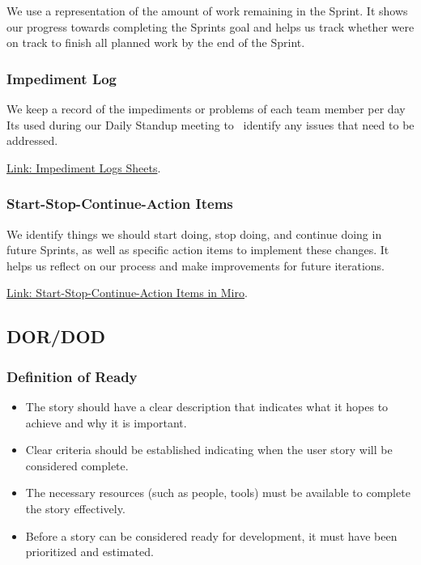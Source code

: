 We use a representation of the amount of work remaining in the Sprint.
It shows our progress towards completing the Sprint\textquotesingle s
goal and helps us track whether we\textquotesingle re on track to finish
all planned work by the end of the Sprint.

\hypertarget{impedimentlog}{
\subsubsection{\texorpdfstring{\textbf{Impediment
Log}}{Impediment Log}}\label{impedimentlog}}

We keep a record of the impediments or problems of each team member per
day It\textquotesingle s used during our Daily Standup meeting to
~identify any issues that need to be addressed.

\href{https://jalafoundation.sharepoint.com/:f:/s/CoffeeTime/EvrueabkwZZPn-vQxfzknlcBg55BRdrfIEqUw9mxtrYNWg?e=JVZHfq}{Link: Impediment Logs Sheets}.


\hypertarget{startstopcontinueactionitems}{
\subsubsection{\texorpdfstring{\textbf{Start-Stop-Continue-Action
Items}}{Start-Stop-Continue-Action Items}}\label{startstopcontinueactionitems}}

We identify things we should start doing, stop doing, and continue doing
in future Sprints, as well as specific action items to implement these
changes. It helps us reflect on our process and make improvements for
future iterations.

\href{https://miro.com/app/board/uXjVKDO7l8M=/?share_link_id=7422815223}{Link: Start-Stop-Continue-Action Items in Miro}.

\newpage

\hypertarget{dordod}{
\subsection{DOR/DOD}\label{dordod}}

\hypertarget{definitionofready}{
\subsubsection{\texorpdfstring{\textbf{Definition of
Ready}}{Definition of Ready}}\label{definitionofready}}

\begin{itemize}
\tightlist
\item
  The story should have a clear description that indicates what it hopes
  to achieve and why it is important.
\item
  Clear criteria should be established indicating when the user story
  will be considered complete.
\item
  The necessary resources (such as people, tools) must be available to
  complete the story effectively.
\item
  Before a story can be considered ready for development, it must have
  been prioritized and estimated.
\end{itemize}

